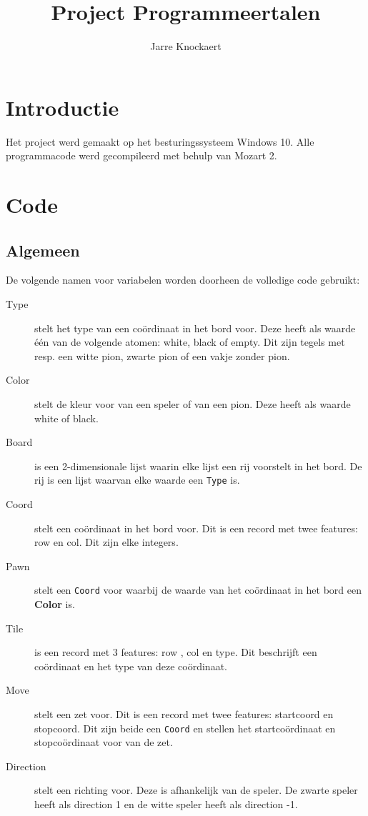 \documentclass{article}
\title{Project Programmeertalen}
\author{Jarre Knockaert}
\date{}
\begin{document}
\maketitle
\newpage
\tableofcontents
\newpage
{}
\section{Introductie}

Het project werd gemaakt op het besturingssysteem Windows 10. 
Alle programmacode werd gecompileerd met behulp van Mozart 2. 

\section{Code}	

\subsection{Algemeen}

De volgende namen voor variabelen worden doorheen de volledige code gebruikt:
\begin{description}
	\item[Type] stelt het type van een coördinaat in het bord voor. Deze heeft als waarde één van de volgende atomen: white, black of empty. Dit zijn tegels met resp. een witte pion, zwarte pion of een vakje zonder pion. 
	\item[Color] stelt de kleur voor van een speler of van een pion.  Deze heeft als waarde  white of black.
	\item[Board] is een 2-dimensionale lijst waarin elke lijst een rij voorstelt in het bord. De rij is een lijst waarvan elke waarde een \texttt{Type} is.
	\item[Coord] stelt een coördinaat in het bord voor. Dit is een record met twee features: row en col. Dit zijn elke integers. 
	\item[Pawn] stelt een \texttt{Coord} voor waarbij de waarde van het coördinaat in het bord een \textbf{Color} is.
	\item[Tile] is een record met 3 features: row , col en type. Dit beschrijft een coördinaat en het type van deze coördinaat.
	\item[Move] stelt een zet voor. Dit is een record met twee features: startcoord en stopcoord. Dit zijn beide een \texttt{Coord} en stellen het startcoördinaat en stopcoördinaat voor van de zet.
	\item[Direction] stelt een richting voor. Deze is afhankelijk van de speler. De zwarte speler heeft als direction 1 en de witte speler heeft als direction -1.
\end{description}
\end{document}
